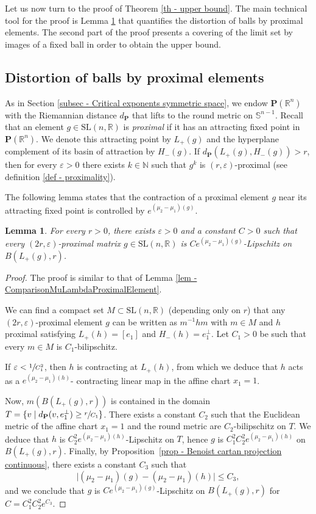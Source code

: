 \documentclass[JEP,XML,SOM,Unicode,NoEqCountersInSection,NoFloatCountersInSection,published]{cedram}
\newtheorem{lemma}[theo]{Lemma}
\theoremstyle{definition}
\newcommand{\proj}{\mathbf{P}}
\newcommand{\R}{\mathbb{R}}
\newcommand{\N}{\mathbb{N}}
\newcommand{\SL}{\mathrm{SL}}
\let\epsilon\varepsilon
\begin{document}
Let us now turn to the proof of Theorem \ref{th - upper bound}. The main technical tool for the proof is Lemma \ref{lem - quantified distortion of balls by loxodromic element} that quantifies the distortion of balls by proximal elements. The second part of the proof presents a covering of the limit set by images of a fixed ball in order to obtain the upper bound.

\subsection{Distortion of balls by proximal elements}

As in Section \ref{subsec - Critical exponents symmetric space}, we endow $\proj(\R^n)$ with the Riemannian distance $d_\proj$ that lifts to the round metric on $\mathbb{S}^{n-1}$. Recall that an element $g\in\SL(n,\R)$ is \emph{proximal} if it has an attracting fixed point in $\proj(\R^n)$. We denote this attracting point by $L_+(g)$ and the hyperplane complement of its basin of attraction by $H_-(g)$. If $d_\proj(L_+(g), H_-(g)) > r$, then for every $\epsilon>0$ there exists $k \in \N$ such that $g^k$ is $(r,\epsilon)$-proximal (see definition \ref{def - proximality}).

The following lemma states that the contraction of a proximal element $g$ near its attracting fixed point is controlled by $e^{(\mu_2-\mu_1)(g)}$.

\begin{lemma}\label{lem - quantified distortion of balls by loxodromic element}
For every $r>0$, there exists $\epsilon >0$ and a constant $C>0$ such that every $(2r,\epsilon)$-proximal matrix $g\in \SL(n,\R)$ is $Ce^{(\mu_2-\mu_1)(g)}$-Lipschitz on $B(L_+(g),r)$.
\end{lemma}

\begin{proof}
The proof is similar to that of Lemma \ref{lem - ComparisonMuLambdaProximalElement}.

We can find a compact set $M \subset \SL(n,\R)$ (depending only on $r$) that any $(2r,\epsilon)$-proximal element $g$ can be written as $m^{-1}hm$ with $m\in M$ and $h$ proximal satisfying $L_+(h) = [e_1]$ and $H_-(h) = e_1^\perp$. Let $C_1>0$ be such that every $m\in M$ is $C_1$-bilipschitz.

If $\epsilon < \sfrac{1}{C_1^2}$, then $h$ is contracting at $L_+(h)$, from which we deduce that $h$ acts as a $e^{(\mu_2-\mu_1)(h)}$- contracting linear map in the affine chart $x_1=1$.

Now, $m(B(L_+(g),r))$ is contained in the domain $T = \{v \mid d_\proj(v, e_1^\perp) \geq \sfrac{r}{C_1}\}$. There exists a constant $C_2$ such that the Euclidean metric of the affine chart $x_1=1$ and the round metric are $C_2$-bilipschitz on $T$. We deduce that $h$ is $C_2^2e^{(\mu_2-\mu_1)(h)}$-Lipschitz on $T$, hence $g$ is $C_1^2 C_2^2e^{(\mu_2-\mu_1)(h)}$ on $B(L_+(g),r)$. Finally, by Proposition~\ref{prop - Benoist cartan projection continuous}, there exists a constant $C_3$ such that
\[\vert(\mu_2-\mu_1)(g)- (\mu_2-\mu_1)(h)\vert \leq C_3 ,\] and we conclude that $g$ is $Ce^{(\mu_2-\mu_1)(g)}$-Lipschitz on $B(L_+(g),r)$ for $C=C_1^2 C_2^2e^{C_3}$.
\end{proof}
\end{document}
